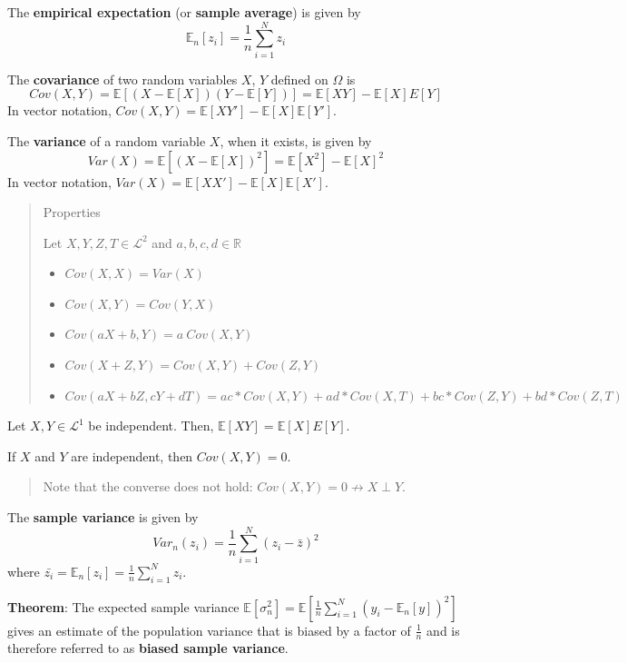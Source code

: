 \documentclass[12pt,]{book}
\providecommand{\tightlist}{%
  \setlength{\itemsep}{0pt}\setlength{\parskip}{0pt}}
\begin{document}
The \textbf{empirical expectation} (or \textbf{sample average}) is given by
\[
        \mathbb{E}_n [z_i] = \frac{1}{n} \sum _ {i=1}^N z_i 
\]

The \textbf{covariance} of two random variables \(X\), \(Y\) defined on \(\Omega\) is
\[
    Cov(X, Y ) = \mathbb{E}[ (X - \mathbb{E}[X]) (Y - \mathbb{E}[Y]) ]  = \mathbb{E}[XY ] - \mathbb{E}[X]E[Y]
\]
In vector notation, \(Cov(X, Y) = \mathbb{E}[XY'] - \mathbb{E}[X]\mathbb{E}[Y']\).

The \textbf{variance} of a random variable \(X\), when it exists, is given by
\[
    Var(X) = \mathbb{E}[ (X - \mathbb{E}[X])^2 ] = \mathbb{E}[X^2] - \mathbb{E}[X]^2
\]
In vector notation, \(Var(X) = \mathbb{E}[XX'] - \mathbb{E}[X]\mathbb{E}[X']\).

\begin{quote}
Properties

Let \(X, Y, Z, T \in \mathcal{L}^{2}\) and \(a, b, c, d \in \mathbb{R}\)

\begin{itemize}
\tightlist
\item
  \(Cov(X, X) = Var(X)\)
\item
  \(Cov(X, Y) = Cov(Y, X)\)
\item
  \(Cov(aX + b, Y) = a \ Cov(X,Y)\)
\item
  \(Cov(X+Z, Y) = Cov(X,Y) + Cov(Z,Y)\)
\item
  \(Cov(aX + bZ, cY + dT) = ac * Cov(X,Y) + ad * Cov(X,T) + bc * Cov(Z,Y) + bd * Cov(Z,T)\)
\end{itemize}
\end{quote}

Let \(X, Y \in \mathcal L^1\) be independent. Then, \(\mathbb E[XY] = \mathbb E[X]E[Y]\).

If \(X\) and \(Y\) are independent, then \(Cov(X,Y) = 0\).

\begin{quote}
Note that the converse does not hold: \(Cov(X,Y) = 0 \not \to X \perp Y\).
\end{quote}

The \textbf{sample variance} is given by
\[
    Var_n (z_i) = \frac{1}{n} \sum _ {i=1}^N (z_i - \bar{z})^2 
\]
where \(\bar{z_i} = \mathbb{E}_n [z_i] = \frac{1}{n} \sum _ {i=1}^N z_i\).

\textbf{Theorem}:
The expected sample variance \(\mathbb{E} [\sigma^2_n] = \mathbb{E} \left[ \frac{1}{n} \sum _ {i=1}^N \left(y_i - \mathbb{E}_n[y] \right)^2 \right]\) gives an estimate of the population variance that is biased by a factor of \(\frac{1}{n}\) and is therefore referred to as \textbf{biased sample variance}.
\end{document}
